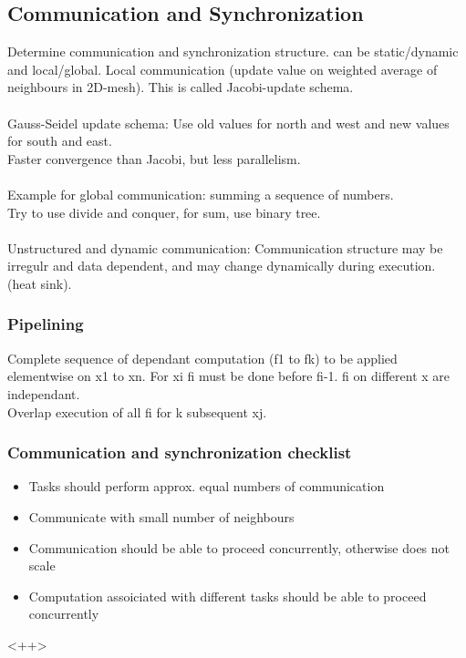 \documentclass[a4paper]{article}
\begin{document}
\subsection{Communication and Synchronization}
Determine communication and synchronization structure. can be static/dynamic and
local/global. Local communication (update value on weighted average of neighbours
in 2D-mesh). This is called Jacobi-update schema.\\
\\Gauss-Seidel update schema: Use old values for north and west and new values for
south and east.
\\Faster convergence than Jacobi, but less parallelism.
\\
\\Example for global communication: summing a sequence of numbers.\\
Try to use divide and conquer, for sum, use binary tree.\\
\\Unstructured and dynamic communication: Communication structure may be irregulr
and data dependent, and may change dynamically during execution. (heat sink).

\subsubsection{Pipelining}
Complete sequence of dependant computation (f1 to fk) to be applied elementwise
on x1 to xn.  For xi fi must be done before fi-1. fi on different x are independant.
\\Overlap execution of all fi for k subsequent xj.

\subsubsection{Communication and synchronization checklist}
\begin{itemize}
    \item Tasks should perform approx. equal numbers of communication
    \item Communicate with small number of neighbours
    \item Communication should be able to proceed concurrently, otherwise does not scale
    \item Computation assoiciated with different tasks should be able to proceed concurrently
\end{itemize}<++>
\end{document}
